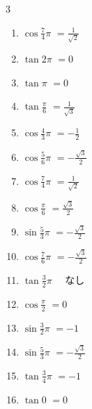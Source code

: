 \begin{multicols}{3}
\begin{enumerate}
  \item $\displaystyle \cos{\frac{7}{4}\pi}$
        $\displaystyle =\frac{1}{\sqrt{2}}$

  \item $\displaystyle \tan{2\pi}$
        $\displaystyle =0$

  \item $\displaystyle \tan{\pi}$
        $\displaystyle =0$

  \item $\displaystyle \tan{\frac{\pi}{6}}$
        $\displaystyle =\frac{1}{\sqrt{3}}$

  \item $\displaystyle \cos{\frac{4}{3}\pi}$
        $\displaystyle =-\frac{1}{2}$

  \item $\displaystyle \cos{\frac{5}{6}\pi}$
        $\displaystyle =-\frac{\sqrt{3}}{2}$

  \item $\displaystyle \cos{\frac{7}{4}\pi}$
        $\displaystyle =\frac{1}{\sqrt{2}}$

  \item $\displaystyle \cos{\frac{\pi}{6}}$
        $\displaystyle =\frac{\sqrt{3}}{2}$

  \item $\displaystyle \sin{\frac{5}{3}\pi}$
        $\displaystyle =-\frac{\sqrt{3}}{2}$

  \item $\displaystyle \cos{\frac{7}{6}\pi}$
        $\displaystyle =-\frac{\sqrt{3}}{2}$

\columnbreak %

  \item $\displaystyle \tan{\frac{3}{2}\pi}$
        $\displaystyle \quad なし$

  \item $\displaystyle \cos{\frac{\pi}{2}}$
        $\displaystyle =0$

  \item $\displaystyle \sin{\frac{3}{2}\pi}$
        $\displaystyle =-1$

  \item $\displaystyle \sin{\frac{5}{3}\pi}$
        $\displaystyle =-\frac{\sqrt{3}}{2}$

  \item $\displaystyle \tan{\frac{3}{4}\pi}$
        $\displaystyle =-1$

  \item $\displaystyle \tan{0}$
        $\displaystyle =0$


\end{enumerate}
\end{multicols}
